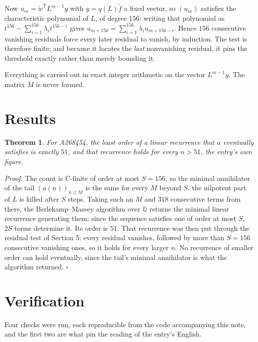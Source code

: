 \documentclass[11pt]{article}
\newtheorem{theorem}{Theorem}
\theoremstyle{definition}
\begin{document}
Now $u_m = \tilde w^{\mathsf T} L^{m-1} y$ with $y = q(L)\tilde f$ a fixed vector, so $(u_m)$ satisfies the characteristic polynomial of $L$, of degree $156$: writing that polynomial as $t^{156} - \sum_{i=1}^{156} \lambda_i t^{156-i}$ gives $u_{m+156} = \sum_{i=1}^{156} \lambda_i u_{m+156-i}$. Hence $156$ consecutive vanishing residuals force every later residual to vanish, by induction. The test is therefore finite; and because it locates the {\itshape last} nonvanishing residual, it pins the threshold exactly rather than merely bounding it.

Everything is carried out in exact integer arithmetic on the vector $L^{m-1}y$. The matrix $M$ is never formed.

\section{Results}

\begin{theorem} For A268454, the least order of a linear recurrence that $a$ eventually satisfies is exactly $51$, and that recurrence holds for every $n > 51$, the entry's own figure.\end{theorem}

{\itshape Proof.} The count is C-finite of order at most $S = 156$, so the minimal annihilator of the tail $(a(n))_{n \ge M}$ is the same for every $M$ beyond $S$: the nilpotent part of $L$ is killed after $S$ steps. Taking such an $M$ and $318$ consecutive terms from there, the Berlekamp--Massey algorithm over $\mathbb{Q}$ returns the minimal linear recurrence generating them; since the sequence satisfies one of order at most $S$, $2S$ terms determine it. Its order is $51$. That recurrence was then put through the residual test of Section 5: every residual vanishes, followed by more than $S = 156$ consecutive vanishing ones, so it holds for every larger $n$. No recurrence of smaller order can hold eventually, since the tail's minimal annihilator is what the algorithm returned. $\square$

\section{Verification}

Four checks were run, each reproducible from the code accompanying this note, and the first two are what pin the reading of the entry's English.
\end{document}
